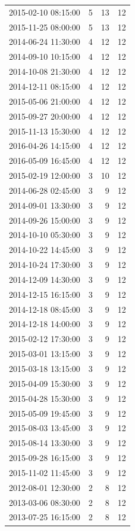 \begin{tabular}{lrrr}
2015-02-10 08:15:00 & 5 & 13 & 12 \\
2015-11-25 08:00:00 & 5 & 13 & 12 \\
2014-06-24 11:30:00 & 4 & 12 & 12 \\
2014-09-10 10:15:00 & 4 & 12 & 12 \\
2014-10-08 21:30:00 & 4 & 12 & 12 \\
2014-12-11 08:15:00 & 4 & 12 & 12 \\
2015-05-06 21:00:00 & 4 & 12 & 12 \\
2015-09-27 20:00:00 & 4 & 12 & 12 \\
2015-11-13 15:30:00 & 4 & 12 & 12 \\
2016-04-26 14:15:00 & 4 & 12 & 12 \\
2016-05-09 16:45:00 & 4 & 12 & 12 \\
2015-02-19 12:00:00 & 3 & 10 & 12 \\
2014-06-28 02:45:00 & 3 & 9 & 12 \\
2014-09-01 13:30:00 & 3 & 9 & 12 \\
2014-09-26 15:00:00 & 3 & 9 & 12 \\
2014-10-10 05:30:00 & 3 & 9 & 12 \\
2014-10-22 14:45:00 & 3 & 9 & 12 \\
2014-10-24 17:30:00 & 3 & 9 & 12 \\
2014-12-09 14:30:00 & 3 & 9 & 12 \\
2014-12-15 16:15:00 & 3 & 9 & 12 \\
2014-12-18 08:45:00 & 3 & 9 & 12 \\
2014-12-18 14:00:00 & 3 & 9 & 12 \\
2015-02-12 17:30:00 & 3 & 9 & 12 \\
2015-03-01 13:15:00 & 3 & 9 & 12 \\
2015-03-18 13:15:00 & 3 & 9 & 12 \\
2015-04-09 15:30:00 & 3 & 9 & 12 \\
2015-04-28 15:30:00 & 3 & 9 & 12 \\
2015-05-09 19:45:00 & 3 & 9 & 12 \\
2015-08-03 13:45:00 & 3 & 9 & 12 \\
2015-08-14 13:30:00 & 3 & 9 & 12 \\
2015-09-28 16:15:00 & 3 & 9 & 12 \\
2015-11-02 11:45:00 & 3 & 9 & 12 \\
2012-08-01 12:30:00 & 2 & 8 & 12 \\
2013-03-06 08:30:00 & 2 & 8 & 12 \\
2013-07-25 16:15:00 & 2 & 8 & 12 \\

\end{tabular}
